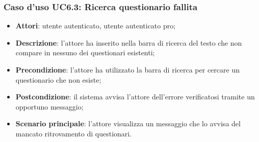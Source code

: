 \subsubsection{Caso d'uso UC6.3: Ricerca questionario fallita}
\label{UC6.3}
\begin{itemize}
\item\textbf{Attori}: utente autenticato, utente autenticato pro;
\item\textbf{Descrizione}: l'attore ha inserito nella barra di ricerca del testo che non compare in nessuno dei questionari esistenti;
\item\textbf{Precondizione}: l'attore ha utilizzato la barra di ricerca per cercare un questionario che non esiste;
\item\textbf{Postcondizione}: il sistema avvisa l'attore dell'errore verificatosi tramite un opportuno messaggio;
\item\textbf{Scenario principale}: l'attore visualizza un messaggio che lo avvisa del mancato ritrovamento di questionari.
\end{itemize}